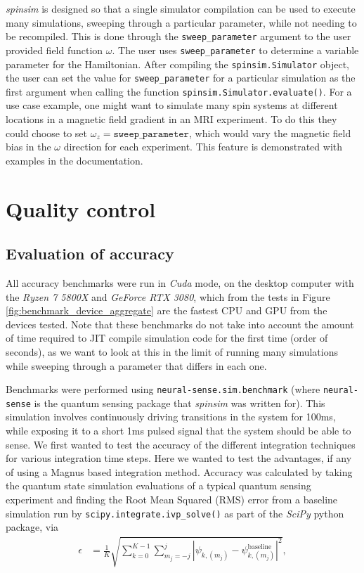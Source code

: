 \documentclass{jors}
\begin{document}
		\emph{spinsim} is designed so that a single simulator compilation can be used to execute many simulations, sweeping through a particular parameter, while not needing to be recompiled.
		This is done through the \texttt{sweep\_parameter} argument to the user provided field function \(\omega\).
		The user uses \texttt{sweep\_parameter} to determine a variable parameter for the Hamiltonian.
		After compiling the \texttt{spinsim.Simulator} object, the user can set the value for \texttt{sweep\_parameter} for a particular simulation as the first argument when calling the function \texttt{spinsim.Simulator.evaluate()}.
		For a use case example, one might want to simulate many spin systems at different locations in a magnetic field gradient in an MRI experiment.
		To do this they could choose to set \(\omega_z =\texttt{sweep\_parameter}\), which would vary the magnetic field bias in the \(\omega\) direction for each experiment.
		This feature is demonstrated with examples in the documentation.

\section{Quality control}
	\subsection{Evaluation of accuracy}
		All accuracy benchmarks were run in \emph{Cuda} mode, on the desktop computer with the \emph{Ryzen 7 5800X} and \emph{GeForce RTX 3080}, which from the tests in Figure \ref{fig:benchmark_device_aggregate} are the fastest CPU and GPU from the devices tested.
		Note that these benchmarks do not take into account the amount of time required to JIT compile simulation code for the first time (order of seconds), as we want to look at this in the limit of running many simulations while sweeping through a parameter that differs in each one.
		
		Benchmarks were performed using \texttt{neural-sense.sim.benchmark} (where \texttt{neural-sense}\cite{alexander-tritt-monash_alexander-tritt-monashneural-sense_2020} is the quantum sensing package that \emph{spinsim} was written for).
		This simulation involves continuously driving transitions in the system for 100ms, while exposing it to a short 1ms pulsed signal that the system should be able to sense.
		We first wanted to test the accuracy of the different integration techniques for various integration time steps.
		Here we wanted to test the advantages, if any of using a Magnus based integration method.
		Accuracy was calculated by taking the quantum state simulation evaluations of a typical quantum sensing experiment and finding the Root Mean Squared (RMS) error from a baseline simulation run by \texttt{scipy.integrate.ivp\_solve()} as part of the \emph{SciPy} python package, via
		\begin{align}
			\epsilon &= \frac{1}{K}\sqrt{\sum_{k = 0}^{K - 1}\sum_{m_j = -j}^j|\psi_{k, (m_j)} - \psi_{k, (m_j)}^{\textrm{baseline}}|^2},\label{eq:error}
		\end{align}
\end{document}
